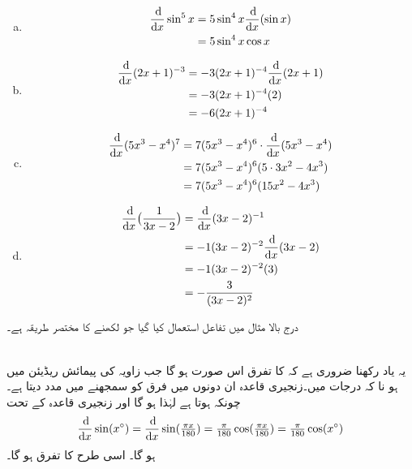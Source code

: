 \begin{enumerate}[a.]

\item
\begin{align*}
\frac{\dif}{\dif x}\sin^5x&=5\sin^4x\frac{\dif}{\dif x}(\sin x)\\
&=5\sin^4x\cos x
\end{align*}
\item
\begin{align*}
\frac{\dif}{\dif x}(2x+1)^{-3}&=-3(2x+1)^{-4}\frac{\dif}{\dif x}(2x+1)\\
&=-3(2x+1)^{-4}(2)\\
&=-6(2x+1)^{-4}
\end{align*}
\item
\begin{align*}
\frac{\dif}{\dif x}(5x^3-x^4)^7&=7(5x^3-x^4)^6\cdot \frac{\dif}{\dif x}(5x^3-x^4)\\
&=7(5x^3-x^4)^6(5\cdot 3x^2-4x^3)\\
&=7(5x^3-x^4)^6(15x^2-4x^3)
\end{align*}
\item
\begin{align*}
\frac{\dif}{\dif x}\big(\frac{1}{3x-2}\big)&=\frac{\dif}{\dif x}(3x-2)^{-1}\\
&=-1(3x-2)^{-2}\frac{\dif}{\dif x}(3x-2)\\
&=-1(3x-2)^{-2}(3)\\
&=-\frac{3}{(3x-2)^2}
\end{align*}
\end{enumerate}
درج بالا مثال میں تفاعل   استعمال کیا گیا جو  لکھنے کا مختصر طریقہ ہے۔

\\
یہ یاد رکھنا ضروری ہے کہ  کا تفرق اس صورت  ہو گا جب زاویہ کی پیمائش ریڈیئن میں ہو نا کہ درجات میں۔زنجیری قاعدہ ان دونوں میں فرق کو سمجھنے میں مدد دیتا ہے۔ چونکہ  ہوتا ہے لہٰذا  ہو گا اور زنجیری قاعدہ کے تحت
\begin{align*}
\frac{\dif}{\dif x}\sin(x^{\circ})=\frac{\dif}{\dif x}\sin (\tfrac{\pi x}{180})=\tfrac{\pi}{180}\cos (\tfrac{\pi x}{180})=\tfrac{\pi}{180}\cos (x^{\circ})
\end{align*}
ہو گا۔ اسی طرح  کا تفرق  ہو گا۔

